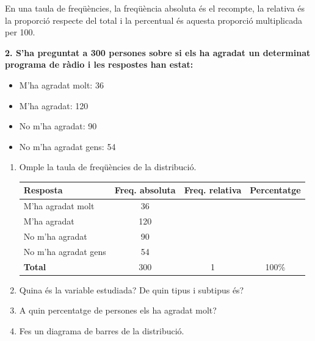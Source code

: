 \documentclass[12pt,a4paper]{article}
\begin{document}
\begin{capsula}
En una taula de freqüències, la freqüència absoluta és el recompte, la relativa és la proporció respecte del total i la percentual és aquesta proporció multiplicada per 100.
\end{capsula}

\textbf{2. S’ha preguntat a 300 persones sobre si els ha agradat un determinat programa de ràdio i les respostes han estat:}
\begin{itemize}
    \item M’ha agradat molt: 36
    \item M’ha agradat: 120
    \item No m’ha agradat: 90
    \item No m’ha agradat gens: 54
\end{itemize}

\begin{enumerate}[label=\alph*)]
    \item Omple la taula de freqüències de la distribució. \vspace{0.3cm}

    \begin{center}
    \begin{tabular}{|p{6cm}|c|c|c|}
    \hline
    \rowcolor{cyan!20}
    \textbf{Resposta} & \textbf{Freq. absoluta} & \textbf{Freq. relativa} & \textbf{Percentatge} \\ \hline
    M’ha agradat molt & 36 & & \\ \hline
    M’ha agradat & 120 & & \\ \hline
    No m’ha agradat & 90 & & \\ \hline
    No m’ha agradat gens & 54 & & \\ \hline
    \textbf{Total} & 300 & 1 & 100\% \\ \hline
    \end{tabular}
    \end{center}

    \item Quina és la variable estudiada? De quin tipus i subtipus és? \vspace{0.8cm}
    \item A quin percentatge de persones els ha agradat molt? \vspace{0.8cm}
    \item Fes un diagrama de barres de la distribució. \vspace{0.3cm}
\end{enumerate}
\end{document}
